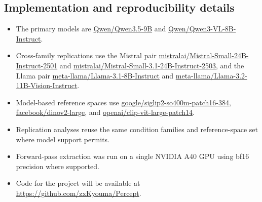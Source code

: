 \documentclass{article}
\begin{document}
\subsection{Implementation and reproducibility details}

\begin{itemize}
  \item The primary models are \url{Qwen/Qwen3.5-9B} and \url{Qwen/Qwen3-VL-8B-Instruct}.
  \item Cross-family replications use the Mistral pair \url{mistralai/Mistral-Small-24B-Instruct-2501} and \url{mistralai/Mistral-Small-3.1-24B-Instruct-2503}, and the Llama pair \url{meta-llama/Llama-3.1-8B-Instruct} and \url{meta-llama/Llama-3.2-11B-Vision-Instruct}.
  \item Model-based reference spaces use \url{google/siglip2-so400m-patch16-384}, \url{facebook/dinov2-large}, and \url{openai/clip-vit-large-patch14}.
  \item Replication analyses reuse the same condition families and reference-space set where model support permits.
  \item Forward-pass extraction was run on a single NVIDIA A40 GPU using bf16 precision where supported.
  \item Code for the project will be available at \url{https://github.com/zxKyouma/Percept}.
\end{itemize}

\newpage

\end{document}
